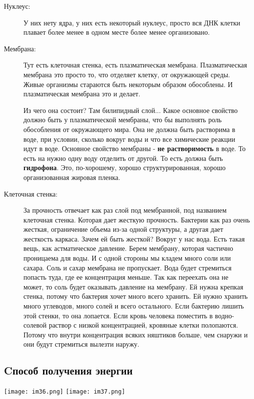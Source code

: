 \begin{description}
\item[Нуклеус:]
У них нету ядра, у них есть некоторый нуклеус, просто вся ДНК
клетки плавает более менее в одном месте более менее организовано.

\item[Мембрана:]
Тут есть клеточная стенка, есть плазматическая мембрана. Плазматическая мембрана
это просто то, что отделяет клетку, от окружающей среды. Живые организмы стараются
быть некоторым образом обособлены. И плазматическая мембрана это и делает.
                                                      
Из чего она состоит? Там билипидный слой... Какое основное
свойство должно быть у плазматической мембраны, что бы выполнять роль обособления
от окружающего мира. Она не должна быть растворима в воде,
при условии, сколько вокруг воды и что все химические реакции идут в воде. Основное
свойство мембраны - \textbf{не растворимость} в воде. То есть на нужно одну воду отделить от другой.
То есть должна быть \textbf{гидрофона}. Это, по-хорошему, хорошо структурированная, хорошо 
организованная жировая пленка. 

\item[Клеточная стенка:]
За прочность отвечает как раз слой под мембранной, под названием клеточная стенка. Которая 
дает жесткую прочность. Бактерии как раз очень жесткая, ограничение объема из-за 
одной структуры, а другая дает жесткость каркаса. Зачем ей быть жесткой? Вокруг у нас
вода. Есть такая вещь, как астматическое давление. Берем мембрану, которая 
частично проницаема для воды. И с одной стороны мы кладем много соли или 
сахара. Соль и сахар мембрана не пропускает. Вода будет стремиться попасть туда, 
где ее концентрация меньше. Так как переехать она не может, 
то соль будет оказывать давление на мембрану. Ей нужна крепкая стенка, 
потому что бактерия хочет много всего хранить. Ей нужно хранить много углеводов, 
много солей и всего остального. Если бактерию лишить этой стенки, то она лопается. 
Если кровь человека поместить в водно-солевой раствор с низкой концентрацией, кровяные 
клетки полопаются. Потому что внутри концентрация всяких няштиков больше, чем снаружи и
они будут стремиться вылезти наружу. 
\end{description}

\subsection{Cпособ получения энергии}
\texttt{[image: im36.png]}
\texttt{[image: im37.png]}

